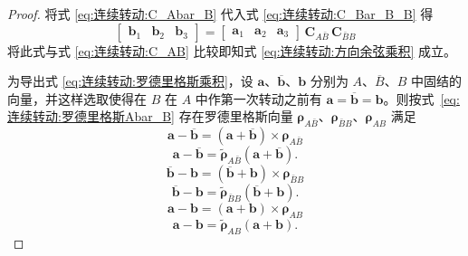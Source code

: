\begin{proof}
    将式 \eqref{eq:连续转动:C_Abar_B} 代入式 \eqref{eq:连续转动:C_Bar_B_B} 得
$$
\begin{bmatrix}\mathbf{b}_1 & \mathbf{b}_2 & \mathbf{b}_3\end{bmatrix}
=\begin{bmatrix}\mathbf{a}_1 & \mathbf{a}_2 & \mathbf{a}_3\end{bmatrix}\,\bm{C}_{A\bar B}\,\bm{C}_{\bar B B}
$$
将此式与式 \eqref{eq:连续转动:C_AB} 比较即知式 \eqref{eq:连续转动:方向余弦乘积} 成立。

为导出式 \eqref{eq:连续转动:罗德里格斯乘积}，设 $\mathbf{a}$、$\overline{\mathbf{b}}$、$\mathbf{b}$ 分别为 $A$、$\overline{B}$、$B$ 中固结的向量，并这样选取使得在 $B$ 在 $A$ 中作第一次转动之前有 $\mathbf{a}=\overline{\mathbf{b}}=\mathbf{b}$。则按式~\eqref{eq:连续转动:罗德里格斯Abar_B} 存在罗德里格斯向量 $\bm{\rho}_{A\bar B}$、$\bm{\rho}_{\bar B B}$、$\bm{\rho}_{AB}$ 满足
\begin{equation}\label{eq:连续转动:罗德里格斯Abar_B}
\mathbf{a}-\overline{\mathbf{b}}=(\mathbf{a}+\overline{\mathbf{b}})\times\bm{\rho}_{A\bar B}
\end{equation}
\begin{equation}
\mathbf{a}-\overline{\mathbf{b}}=\tilde{\bm{\rho}}_{A\bar B}(\mathbf{a}+\overline{\mathbf{b}}).
\label{eq:连续转动:罗德里格斯Abar_B矩阵}
\end{equation}
\begin{equation}\label{eq:连续转动:罗德里格斯Bar_B_B}
\overline{\mathbf{b}}-\mathbf{b}=(\overline{\mathbf{b}}+\mathbf{b})\times\bm{\rho}_{\bar B B}
\end{equation}
\begin{equation}
\overline{\mathbf{b}}-\mathbf{b}=\tilde{\bm{\rho}}_{\bar B B}(\overline{\mathbf{b}}+\mathbf{b}).
\label{eq:连续转动:罗德里格斯Bar_B_B矩阵}
\end{equation}
\begin{equation}\label{eq:连续转动:罗德里格斯AB}
\mathbf{a}-\mathbf{b}=(\mathbf{a}+\mathbf{b})\times\bm{\rho}_{AB}
\end{equation}
\begin{equation}
\mathbf{a}-\mathbf{b}=\tilde{\bm{\rho}}_{AB}(\mathbf{a}+\mathbf{b}).
\label{eq:连续转动:罗德里格斯AB矩阵}
\end{equation}


\end{proof}
